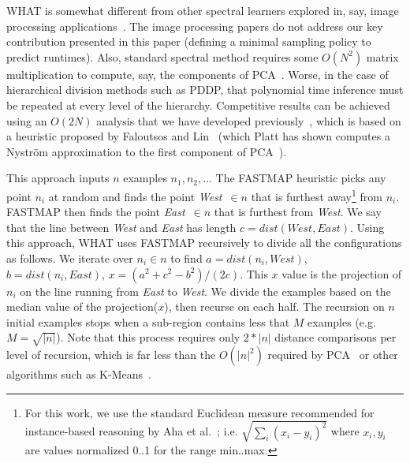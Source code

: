 \documentclass{sig-alternative}
\begin{document}
WHAT is somewhat different from other spectral
learners explored in, say, image processing applications~\cite{shi00}.
The image processing papers do not address
our key contribution presented in this paper  (defining
 a minimal sampling policy to predict runtimes).
Also,
standard spectral method requires some $O(N^2)$ matrix multiplication to compute, say, the components
of PCA~\cite{ilin10}. Worse, in the case of hierarchical division methods such as PDDP,
that polynomial time inference must be repeated at every level of the hierarchy.
Competitive results can be achieved
using an $O(2N)$ analysis that we have developed previously~\cite{me12d}, which is  based on  a heuristic proposed by
Faloutsos and Lin~\cite{Faloutsos1995}
(which
Platt has
  shown computes a Nystr\"om
  approximation to the first component of
  PCA~\cite{platt05}).
  
  This approach inputs
$n$
examples $n_1,n_2,..$. The FASTMAP heuristic
picks any
point $n_i$ at random and  finds
 the point  {\em West}~$\in n$ that is
furthest away\footnote{
 For this work, we use the standard Euclidean measure recommended for
instance-based reasoning by Aha et al.~\cite{aha91};
i.e. $\sqrt{\sum_i(x_i-y_i)^2}$ where $x_i,y_i$
are values normalized 0..1 for the range min..max.}
from $n_i$.
FASTMAP then
finds the point {\em East}~$\in n$
that is furthest from {\em West}.
We say that the line between {\em West} and {\em East} has  length  
$c=\mathit{dist}(\mathit{West},\mathit{East})$.
Using this  approach, WHAT uses FASTMAP recursively to divide all the configurations as follows.
We iterate over $n_i \in n$
to find
$a=\mathit{dist}(n_i,\mathit{West})$,
$b=\mathit{dist}(n_i,\mathit{East})$,
$x=(a^2 + c^2 - b^2)/(2c)$.
This  $x$ value is the projection of $n_i$
on the line  running  from {\em East} to {\em West}.  We divide
the examples based on the median value of the projection($x$),
then recurse on each half. The recursion on
$n$ initial
examples stops when a sub-region
contains less that  $M$ examples (e.g. 
$M=\sqrt{|n|}$).
Note that this process requires only $2*|n|$ distance comparisons
per level of recursion, which is far less than the $O(|n|^2)$
required by PCA~\cite{Du2008}
or other  algorithms such as K-Means~\cite{hamerly2010making}.
\end{document}

